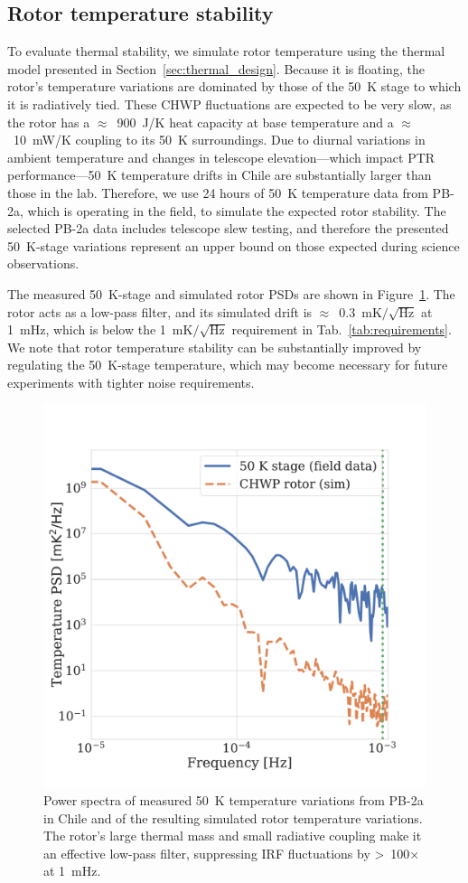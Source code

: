 
\subsection{Rotor temperature stability}
\label{sec:pb2b_chwp_evaluation_rotor_temperature_stability}

To evaluate thermal stability, we simulate rotor temperature using the thermal model presented in Section~\ref{sec:thermal_design}. Because it is floating, the rotor's temperature variations are dominated by those of the 50~K stage to which it is radiatively tied. These CHWP fluctuations are expected to be very slow, as the rotor has a $\approx$~900~J/K heat capacity at base temperature and a $\approx$~10~mW/K coupling to its 50~K surroundings. Due to diurnal variations in ambient temperature and changes in telescope elevation---which impact PTR performance---50~K temperature drifts in Chile are substantially larger than those in the lab. Therefore, we use 24 hours of 50~K temperature data from PB-2a, which is operating in the field, to simulate the expected rotor stability. The selected PB-2a data includes telescope slew testing, and therefore the presented 50~K-stage variations represent an upper bound on those expected during science observations.

The measured 50~K-stage and simulated rotor PSDs are shown in Figure~\ref{fig:hwp_stability}. The rotor acts as a low-pass filter, and its simulated drift is $\approx$~0.3~$\mathrm{mK / \sqrt{Hz}}$ at 1~mHz, which is below the 1~$\mathrm{mK / \sqrt{Hz}}$ requirement in Tab.~\ref{tab:requirements}. We note that rotor temperature stability can be substantially improved by regulating the 50~K-stage temperature, which may become necessary for future experiments with tighter noise requirements.

\begin{figure}[!t]
    \centering
    \includegraphics[width=0.48\linewidth, trim=0.3cm 1cm 2.4cm 3cm, clip]{CHWPEvaluation/Figures/rotor_tempVariation_pb2a_psd.pdf}
    \caption{Power spectra of measured 50~K temperature variations from PB-2a in Chile and of the resulting simulated rotor temperature variations. The rotor's large thermal mass and small radiative coupling make it an effective low-pass filter, suppressing IRF fluctuations by >~100$\times$ at 1~mHz.}
    \label{fig:hwp_stability}
\end{figure}
